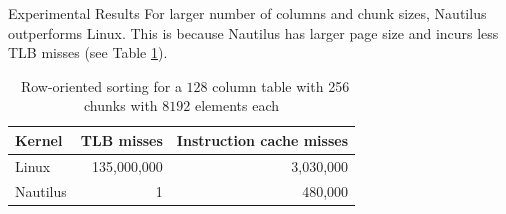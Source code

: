 \begin{block}{Experimental Results}
  For larger number of columns and chunk sizes, Nautilus outperforms Linux. This is because Nautilus has larger page size and incurs less TLB misses (see Table \ref{table:cache_miss}).

    \begin{table}
      \bgroup
      \def\arraystretch{1.3}%
      \setlength\tabcolsep{1cm}
      \begin{tabular}{l || r | r }
        \textbf{Kernel}    & TLB misses  & Instruction cache misses \\
        \hline\hline
        {Linux}            & 135,000,000 & 3,030,000 \\
        {Nautilus}         &           1 &   480,000 \\
      \end{tabular}
\egroup
      \label{table:cache_miss}
      \caption{~Row-oriented sorting for a $128$ column table with 256 chunks with $8192$ elements each}
    \end{table}
  

\end{block}
